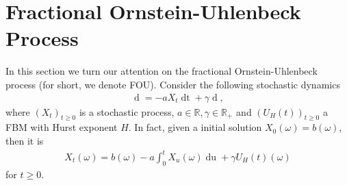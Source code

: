 \documentclass[a4paper, twoside, 11pt]{article}
\theoremstyle{definition}
\newtheorem{definition}{\scshape Definition}[section]
\newtheorem{theorem}[definition]{\scshape Theorem}
\begin{document}



\newpage
\section{Fractional Ornstein-Uhlenbeck Process}
\setcounter{equation}{0}
In this section we turn our attention on the fractional Ornstein-Uhlenbeck process (for short, we denote FOU). Consider the following stochastic dynamics
\begin{eqnarray}
  \mathop{dX_t} = -aX_t\mathop{dt} + \gamma \mathop{dU_H(t)},
\end{eqnarray}
where $(X_t)_{t\ge 0}$ is a stochastic process, $a\in\mathbb{R}, \gamma\in\mathbb{R}_{+}$ and $(U_H(t))_{t\ge 0} $ a FBM with Hurst exponent $H$. In fact, given a initial solution $X_0(\omega)=b(\omega)$, then it is
\begin{eqnarray}
  X_t(\omega) = b(\omega) - a\int_0^t X_u(\omega) \mathop{du} + \gamma U_H(t)(\omega)
  \label{sec:oup}
\end{eqnarray}
for $t \ge 0$.
\end{document}
